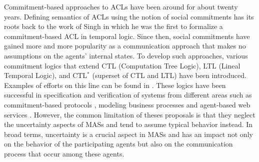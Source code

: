 %


Commitment-based approaches to ACLs have been around for about twenty years. Defining semantics of ACLs using the notion of social commitments has its roots back to the work of Singh \cite{Singh2000} in which he was the first to formalize a commitment-based ACL in temporal logic. Since then, social commitments have gained more and more popularity as a communication approach that makes no assumptions on the agents' internal states. To develop such approaches, various commitment logics that extend CTL (Computation Tree Logic), LTL (Lineal Temporal Logic), and CTL$^{*}$ (superset of CTL and LTL) have been introduced. Examples of efforts on this line can be found in
\cite{Bentahar2004,Giordano2007,Pham2007,Singh2000,Verdicchio2003}.
These logics have been successful in specification
and verification of systems from different areas such as
commitment-based protocols
\cite{Baldoni2010,El-Menshawy2010,Fornara2004b,Yolum2004},
modeling business processes \cite{Desai2009,Telang2009} and
agent-based web services \cite{Bentahar2008}.
However, the common limitation of theses proposals is that they neglect the uncertainty aspects of MASs and tend to assume typical behavior instead. In broad terms, uncertainty is a crucial aspect in MASs and has an impact not only on the behavior of the participating agents but also on the communication process that occur among these agents. %

